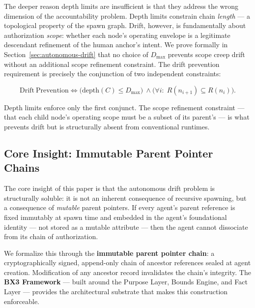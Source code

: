 The deeper reason depth limits are insufficient is that they address the wrong dimension of the accountability problem. Depth limits constrain chain \emph{length} — a topological property of the spawn graph. Drift, however, is fundamentally about authorization \emph{scope}: whether each node's operating envelope is a legitimate descendant refinement of the human anchor's intent. We prove formally in Section~\ref{sec:autonomous-drift} that no choice of $D_{\max}$ prevents scope creep drift without an additional scope refinement constraint. The drift prevention requirement is precisely the conjunction of two independent constraints:

\begin{equation}
\mathrm{Drift\ Prevention} \iff \bigl( \mathrm{depth}(C) \leq D_{\max} \bigr)\ \land \bigl( \forall i:\; R(n_{i+1}) \subseteq R(n_i) \bigr).
\label{eq:intro-drift-prevention}
\end{equation}

Depth limits enforce only the first conjunct. The scope refinement constraint — that each child node's operating scope must be a subset of its parent's — is what prevents drift but is structurally absent from conventional runtimes.

\subsection{Core Insight: Immutable Parent Pointer Chains}
\label{sec:intro-core-insight}

The core insight of this paper is that the autonomous drift problem is structurally soluble: it is not an inherent consequence of recursive spawning, but a consequence of \emph{mutable} parent pointers. If every agent's parent reference is fixed immutably at spawn time and embedded in the agent's foundational identity — not stored as a mutable attribute — then the agent cannot dissociate from its chain of authorization.

We formalize this through the \textbf{immutable parent pointer chain}: a cryptographically signed, append-only chain of ancestor references sealed at agent creation. Modification of any ancestor record invalidates the chain's integrity. The \textbf{BX3 Framework} — built around the Purpose Layer, Bounds Engine, and Fact Layer — provides the architectural substrate that makes this construction enforceable.


